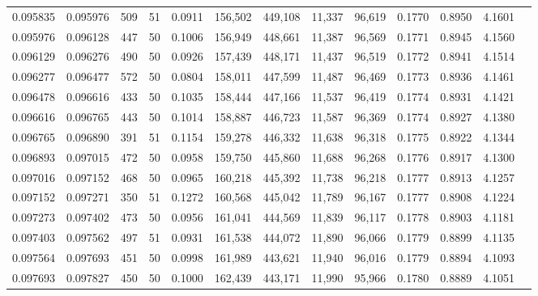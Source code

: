 \begin{tabular}{rrrrrrrrrrrrr}
0.095835 & 0.095976 &   509 &  51 &                                     0.0911 & 156,502 & 449,108 &  11,337 &  96,619 & 0.1770 & 0.8950 & 4.1601 \\
0.095976 & 0.096128 &   447 &  50 &                                     0.1006 & 156,949 & 448,661 &  11,387 &  96,569 & 0.1771 & 0.8945 & 4.1560 \\
0.096129 & 0.096276 &   490 &  50 &                                     0.0926 & 157,439 & 448,171 &  11,437 &  96,519 & 0.1772 & 0.8941 & 4.1514 \\
0.096277 & 0.096477 &   572 &  50 &                                     0.0804 & 158,011 & 447,599 &  11,487 &  96,469 & 0.1773 & 0.8936 & 4.1461 \\
0.096478 & 0.096616 &   433 &  50 &                                     0.1035 & 158,444 & 447,166 &  11,537 &  96,419 & 0.1774 & 0.8931 & 4.1421 \\
0.096616 & 0.096765 &   443 &  50 &                                     0.1014 & 158,887 & 446,723 &  11,587 &  96,369 & 0.1774 & 0.8927 & 4.1380 \\
0.096765 & 0.096890 &   391 &  51 &                                     0.1154 & 159,278 & 446,332 &  11,638 &  96,318 & 0.1775 & 0.8922 & 4.1344 \\
0.096893 & 0.097015 &   472 &  50 &                                     0.0958 & 159,750 & 445,860 &  11,688 &  96,268 & 0.1776 & 0.8917 & 4.1300 \\
0.097016 & 0.097152 &   468 &  50 &                                     0.0965 & 160,218 & 445,392 &  11,738 &  96,218 & 0.1777 & 0.8913 & 4.1257 \\
0.097152 & 0.097271 &   350 &  51 &                                     0.1272 & 160,568 & 445,042 &  11,789 &  96,167 & 0.1777 & 0.8908 & 4.1224 \\
0.097273 & 0.097402 &   473 &  50 &                                     0.0956 & 161,041 & 444,569 &  11,839 &  96,117 & 0.1778 & 0.8903 & 4.1181 \\
0.097403 & 0.097562 &   497 &  51 &                                     0.0931 & 161,538 & 444,072 &  11,890 &  96,066 & 0.1779 & 0.8899 & 4.1135 \\
0.097564 & 0.097693 &   451 &  50 &                                     0.0998 & 161,989 & 443,621 &  11,940 &  96,016 & 0.1779 & 0.8894 & 4.1093 \\
0.097693 & 0.097827 &   450 &  50 &                                     0.1000 & 162,439 & 443,171 &  11,990 &  95,966 & 0.1780 & 0.8889 & 4.1051 \\

\end{tabular}
